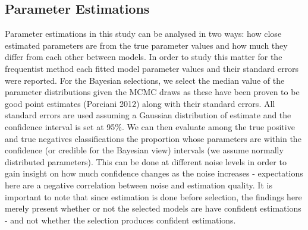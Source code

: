 \documentclass[12pt,]{article}
\begin{document}
\hypertarget{param}{%
\subsection{Parameter Estimations}\label{param}}

Parameter estimations in this study can be analysed in two ways: how close estimated parameters are from the true parameter values and how much they differ from each other between models. In order to study this matter for the frequentist method each fitted model parameter values and their standard errors were reported. For the Bayesian selections, we select the median value of the parameter distributions given the MCMC draws as these have been proven to be good point estimates (Porciani 2012) along with their standard errors. All standard errors are used assuming a Gaussian distribution of estimate and the confidence interval is set at 95\%. We can then evaluate among the true positive and true negatives classifications the proportion whose parameters are within the confidence (or credible for the Bayesian view) intervals (we assume normally distributed parameters). This can be done at different noise levels in order to gain insight on how much confidence changes as the noise increases - expectations here are a negative correlation between noise and estimation quality. It is important to note that since estimation is done before selection, the findings here merely present whether or not the selected models are have confident estimations - and not whether the selection produces confident estimations.
\end{document}
